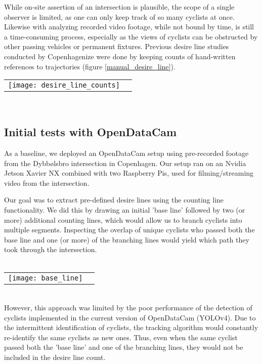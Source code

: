 While on-site assertion of an intersection is plausible, the scope of a single observer is limited, as one can only keep track of 
so many cyclists at once. Likewise with analyzing recorded video footage, while not bound by time, is still a time-consuming process, 
especially as the views of cyclists can be obstructed by other passing vehicles or permanent fixtures. Previous desire line 
studies conducted by Copenhagenize were done by keeping counts of hand-written references to trajectories (figure \ref{manual_desire_line}).
\ \\

\raggedbottom
\noindent
\begin{tabular}{@{}cc}
\texttt{[image: desire\_line\_counts]} 
\end{tabular}
\label{manual_desire_line}
\

\subsection{Initial tests with OpenDataCam}
As a baseline, we deployed an OpenDataCam setup using pre-recorded footage from the Dybbølsbro intersection in Copenhagen.
Our setup ran on an Nvidia Jetson Xavier NX combined with two Raspberry Pis, used for filming/streaming video from the intersection.

Our goal was to extract pre-defined desire lines using the counting line functionality. We did this by drawing an initial 
'base line' followed by two (or more) additional counting lines, which would allow us to branch cyclists into multiple segments. Inspecting the
overlap of unique cyclists who passed both the base line and one (or more) of the branching lines would yield which path
they took through the intersection. 
\ \\

\ \\
\raggedbottom
\noindent
\begin{tabular}{@{}cc}
\texttt{[image: base\_line]} 
\end{tabular}
\ \\

However, this approach was limited by the poor performance of the detection of cyclists implemented in the current 
version of OpenDataCam (YOLOv4). Due to the intermittent identification of cyclists, the tracking algorithm would constantly 
re-identify the same cyclists as new ones. Thus, even when the same cyclist passed both the 'base line' and one of the 
branching lines, they would not be included in the desire line count.
\ \\
 

